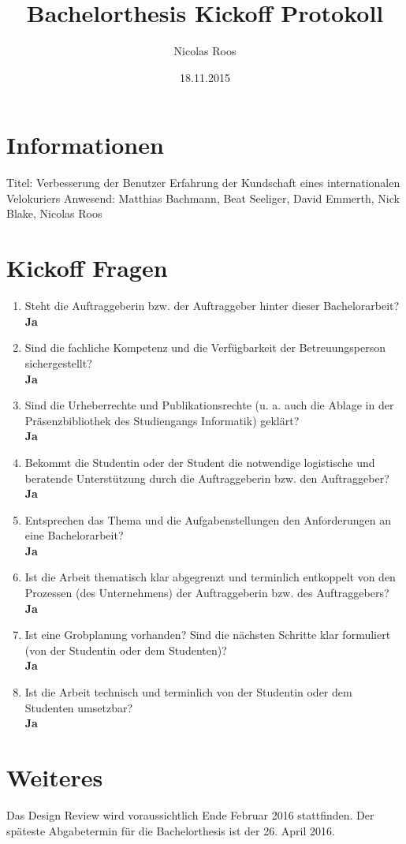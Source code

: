 \documentclass[a4paper]{article}
\begin{document}
\title{Bachelorthesis Kickoff Protokoll}
\author{Nicolas Roos}
\date{18.11.2015}
\maketitle

\section{Informationen}

Titel: Verbesserung der Benutzer Erfahrung der Kundschaft eines internationalen Velokuriers
\newline{}
\newline{}
Anwesend: Matthias Bachmann, Beat Seeliger, David Emmerth, Nick Blake, Nicolas Roos

\section{Kickoff Fragen}

\begin{enumerate}
\item Steht die Auftraggeberin bzw. der Auftraggeber hinter dieser Bachelorarbeit? \\ \textbf{Ja}
\item Sind die fachliche Kompetenz und die Verfügbarkeit der Betreuungsperson sichergestellt? \\ \textbf{Ja}
\item Sind die Urheberrechte und Publikationsrechte (u. a. auch die Ablage in der Präsenzbibliothek des Studiengangs Informatik) geklärt? \\ \textbf{Ja}
\item Bekommt die Studentin oder der Student die notwendige logistische und beratende Unterstützung durch die Auftraggeberin bzw. den Auftraggeber? \\ \textbf{Ja}
\item Entsprechen das Thema und die Aufgabenstellungen den Anforderungen an eine Bachelorarbeit? \\ \textbf{Ja}
\item Ist die Arbeit thematisch klar abgegrenzt und terminlich entkoppelt von den Prozessen (des Unternehmens) der Auftraggeberin bzw. des Auftraggebers? \\ \textbf{Ja}
\item Ist eine Grobplanung vorhanden? Sind die nächsten Schritte klar formuliert (von der Studentin oder dem Studenten)? \\ \textbf{Ja}
\item Ist die Arbeit technisch und terminlich von der Studentin oder dem Studenten umsetzbar? \\ \textbf{Ja}
\end{enumerate}

\section{Weiteres}

Das Design Review wird voraussichtlich Ende Februar 2016 stattfinden. Der späteste Abgabetermin für die Bachelorthesis ist der 26. April 2016.
\end{document}

